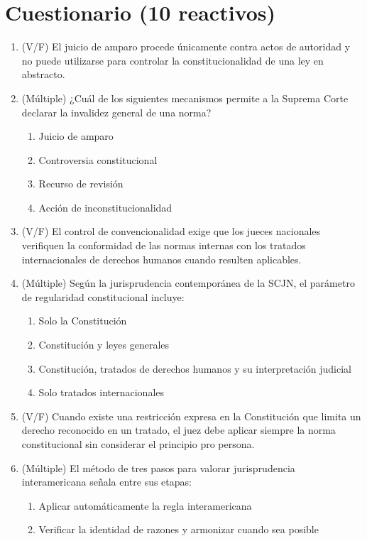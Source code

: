 \documentclass[
  spanish,
  letterpaper, oneside
]{article}
\begin{document}
\section{Cuestionario (10 reactivos)}
\begin{enumerate}
  \item (V/F) El juicio de amparo procede únicamente contra actos de autoridad y no puede utilizarse para controlar la constitucionalidad de una ley en abstracto. 
  \item (Múltiple) ¿Cuál de los siguientes mecanismos permite a la Suprema Corte declarar la invalidez general de una norma?
    \begin{enumerate}[label=\Alph*.]
      \item Juicio de amparo
      \item Controversia constitucional
      \item Recurso de revisión
      \item Acción de inconstitucionalidad
    \end{enumerate}
  \item (V/F) El control de convencionalidad exige que los jueces nacionales verifiquen la conformidad de las normas internas con los tratados internacionales de derechos humanos cuando resulten aplicables.
  \item (Múltiple) Según la jurisprudencia contemporánea de la SCJN, el parámetro de regularidad constitucional incluye:
    \begin{enumerate}[label=\Alph*.]
      \item Solo la Constitución
      \item Constitución y leyes generales
      \item Constitución, tratados de derechos humanos y su interpretación judicial
      \item Solo tratados internacionales
    \end{enumerate}
  \item (V/F) Cuando existe una restricción expresa en la Constitución que limita un derecho reconocido en un tratado, el juez debe aplicar siempre la norma constitucional sin considerar el principio pro persona.
  \item (Múltiple) El método de tres pasos para valorar jurisprudencia interamericana señala entre sus etapas:
    \begin{enumerate}[label=\Alph*.]
      \item Aplicar automáticamente la regla interamericana
      \item Verificar la identidad de razones y armonizar cuando sea posible

\end{enumerate}
\end{enumerate}
\end{document}
